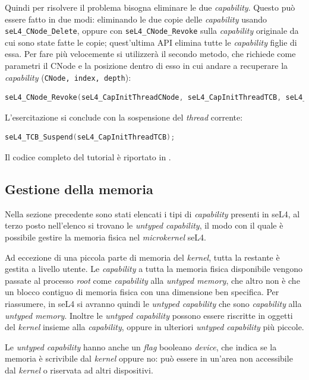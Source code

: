 Quindi per risolvere il problema bisogna eliminare le due \textit{capability}. Questo può essere fatto in due modi: eliminando le due copie delle \textit{capability} usando \texttt{seL4\_CNode\_Delete}, oppure con \texttt{seL4\_CNode\_Revoke} sulla \textit{capability} originale da cui sono state fatte le copie; quest'ultima API elimina tutte le \textit{capability} figlie di essa. Per fare più velocemente si utilizzerà il secondo metodo, che richiede come parametri il CNode e la posizione dentro di esso in cui andare a recuperare la \textit{capability} (\texttt{CNode, index, depth}):
\begin{lstlisting}[language=C++]
seL4_CNode_Revoke(seL4_CapInitThreadCNode, seL4_CapInitThreadTCB, seL4_WordBits);
\end{lstlisting}

L'esercitazione si conclude con la sospensione del \textit{thread} corrente:
\begin{lstlisting}[language=C++]
seL4_TCB_Suspend(seL4_CapInitThreadTCB);
\end{lstlisting}
Il codice completo del tutorial è riportato in \cite{capability}.

\subsection{Gestione della memoria}
Nella sezione precedente sono stati elencati i tipi di \textit{capability} presenti in seL4, al terzo posto nell'elenco si trovano le \textit{untyped capability}, il modo con il quale è possibile gestire la memoria fisica nel \textit{microkernel} seL4.

Ad eccezione di una piccola parte di memoria del \textit{kernel}, tutta la restante è gestita a livello utente. Le \textit{capability} a tutta la memoria fisica disponibile vengono passate al processo \textit{root} come \textit{capability} alla \textit{untyped memory}, che altro non è che un blocco contiguo di memoria fisica con una dimensione ben specifica. Per riassumere, in seL4 si avranno quindi le \textit{untyped capability} che sono \textit{capability} alla \textit{untyped memory}. Inoltre le \textit{untyped capability} possono essere riscritte in oggetti del \textit{kernel} insieme alla \textit{capability}, oppure in ulteriori \textit{untyped capability} più piccole.

Le \textit{untyped capability} hanno anche un \textit{flag} booleano \textit{device}, che indica se la memoria è scrivibile dal \textit{kernel} oppure no: può essere in un'area non accessibile dal \textit{kernel} o riservata ad altri dispositivi.

